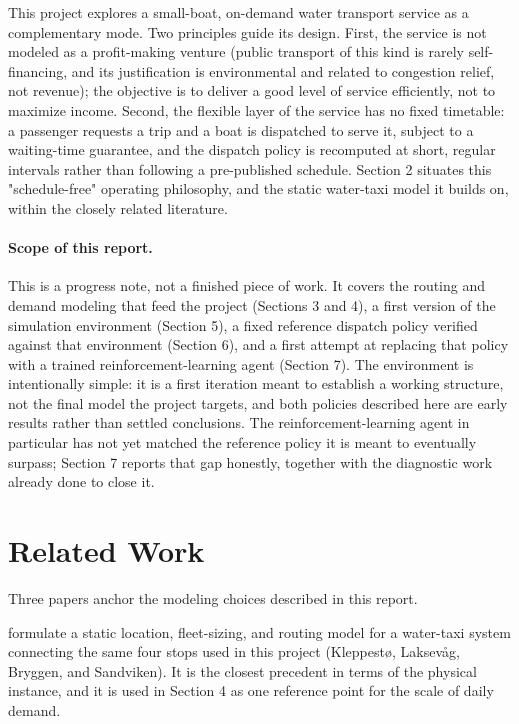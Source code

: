 \documentclass[11pt,a4paper]{article}
\begin{document}
This project explores a small-boat, on-demand water transport service as a complementary mode. Two principles guide its design. First, the service is not modeled as a profit-making venture (public transport of this kind is rarely self-financing, and its justification is environmental and related to congestion relief, not revenue); the objective is to deliver a good level of service efficiently, not to maximize income. Second, the flexible layer of the service has no fixed timetable: a passenger requests a trip and a boat is dispatched to serve it, subject to a waiting-time guarantee, and the dispatch policy is recomputed at short, regular intervals rather than following a pre-published schedule. Section 2 situates this "schedule-free" operating philosophy, and the static water-taxi model it builds on, within the closely related literature.

\paragraph{Scope of this report.} This is a progress note, not a finished piece of work. It covers the routing and demand modeling that feed the project (Sections 3 and 4), a first version of the simulation environment (Section 5), a fixed reference dispatch policy verified against that environment (Section 6), and a first attempt at replacing that policy with a trained reinforcement-learning agent (Section 7). The environment is intentionally simple: it is a first iteration meant to establish a working structure, not the final model the project targets, and both policies described here are early results rather than settled conclusions. The reinforcement-learning agent in particular has not yet matched the reference policy it is meant to eventually surpass; Section 7 reports that gap honestly, together with the diagnostic work already done to close it.

\section{Related Work}

Three papers anchor the modeling choices described in this report.

\citet{Gu2021} formulate a static location, fleet-sizing, and routing model for a water-taxi system connecting the same four stops used in this project (Kleppestø, Laksevåg, Bryggen, and Sandviken). It is the closest precedent in terms of the physical instance, and it is used in Section 4 as one reference point for the scale of daily demand.
\end{document}

